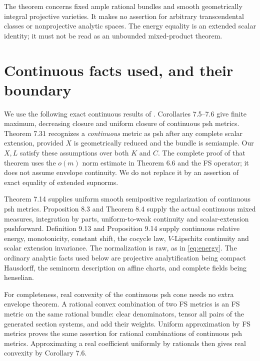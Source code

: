 \documentclass[11pt]{article}
\theoremstyle{remark}
\begin{document}
The theorem concerns fixed ample rational bundles and smooth
geometrically integral projective varieties. It makes no assertion for
arbitrary transcendental classes or nonprojective analytic spaces.
The energy equality is an extended scalar identity; it must not be
read as an unbounded mixed-product theorem.

\section{Continuous facts used, and their boundary}

We use the following exact continuous results of \cite{BE}.
Corollaries 7.5--7.6 give finite maximum, decreasing closure and uniform
closure of continuous psh metrics. Theorem 7.31 recognizes a
\emph{continuous} metric as psh after any complete scalar extension,
provided $X$ is geometrically reduced and the bundle is semiample.
Our $X,L$ satisfy these assumptions over both $K$ and $C$.
The complete proof of that theorem uses the $o(m)$ norm estimate in
Theorem 6.6 and the FS operator; it does not assume envelope continuity.
We do not replace it by an assertion of exact equality of extended
supnorms.

Theorem 7.14 supplies uniform smooth semipositive regularization of
continuous psh metrics. Proposition 8.3 and Theorem 8.4 supply the
actual continuous mixed measures, integration by parts, uniform-to-weak
continuity and scalar-extension pushforward. Definition 9.13 and
Proposition 9.14 supply continuous relative energy, monotonicity,
constant shift, the cocycle law, $V$-Lipschitz continuity and scalar
extension invariance. The normalization is raw, as in
\eqref{eq:energy}. The ordinary analytic facts used below are
projective analytification being compact Hausdorff, the seminorm
description on affine charts, and complete fields being henselian.

For completeness, real convexity of the continuous psh cone needs no
extra envelope theorem. A rational convex combination of two FS
metrics is an FS metric on the same rational bundle: clear
denominators, tensor all pairs of the generated section systems, and
add their weights. Uniform approximation by FS metrics proves the
same assertion for rational combinations of continuous psh metrics.
Approximating a real coefficient uniformly by rationals then gives
real convexity by Corollary 7.6.
\end{document}

